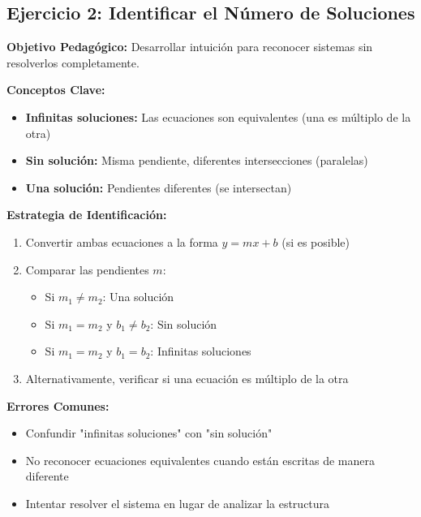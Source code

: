 \subsection*{Ejercicio 2: Identificar el Número de Soluciones}

\textbf{Objetivo Pedagógico:} Desarrollar intuición para reconocer sistemas sin resolverlos completamente.

\textbf{Conceptos Clave:}

\begin{itemize}
    \item \textbf{Infinitas soluciones:} Las ecuaciones son equivalentes (una es múltiplo de la otra)
    \item \textbf{Sin solución:} Misma pendiente, diferentes intersecciones (paralelas)
    \item \textbf{Una solución:} Pendientes diferentes (se intersectan)
\end{itemize}

\textbf{Estrategia de Identificación:}

\begin{enumerate}
    \item Convertir ambas ecuaciones a la forma $y = mx + b$ (si es posible)
    \item Comparar las pendientes $m$:
    \begin{itemize}
        \item Si $m_1 \neq m_2$: Una solución
        \item Si $m_1 = m_2$ y $b_1 \neq b_2$: Sin solución
        \item Si $m_1 = m_2$ y $b_1 = b_2$: Infinitas soluciones
    \end{itemize}
    \item Alternativamente, verificar si una ecuación es múltiplo de la otra
\end{enumerate}

\textbf{Errores Comunes:}
\begin{itemize}
    \item Confundir "infinitas soluciones" con "sin solución"
    \item No reconocer ecuaciones equivalentes cuando están escritas de manera diferente
    \item Intentar resolver el sistema en lugar de analizar la estructura
\end{itemize}

